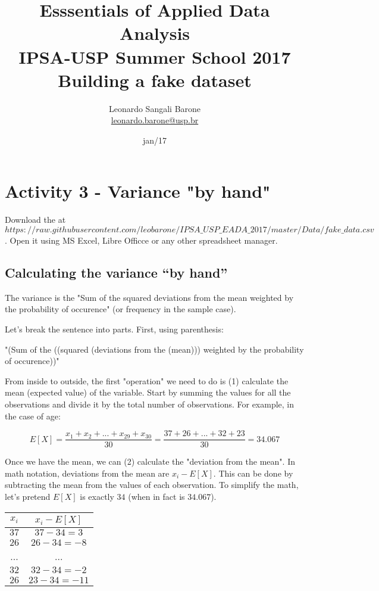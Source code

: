 \documentclass[11pt]{article}
\title{\textbf{Esssentials of Applied Data Analysis\\
				IPSA-USP Summer School 2017}\newline\\
				Building a fake dataset}
\author{Leonardo Sangali Barone\\ \href{leonardo.barone@usp.br}{leonardo.barone@usp.br}}
\date{jan/17}
\begin{document}
\maketitle

\section*{Activity 3 - Variance "by hand"
}


Download the at 
\[https://raw.githubusercontent.com/leobarone/IPSA\_USP\_EADA\_2017/master/Data/fake\_data.csv\]. 
Open it using MS Excel, Libre Officce or any other spreadsheet manager.

\subsection*{Calculating the variance ``by hand''}

The variance is the "Sum of the squared deviations from the mean weighted by the probability of occurence" (or frequency in the sample case).

Let's break the sentence into parts. First, using parenthesis:

"(Sum of the ((squared (deviations from the (mean))) weighted by the probability of occurence))"

From inside to outside, the first "operation" we need to do is (1) calculate the mean (expected value) of the variable. Start by summing the values for all the observations and divide it by the total number of observations. For example, in the case of age:

\[E[X] = \frac{x_1 + x_2 + ... + x_{29} + x_{30}}{30} = \frac{37+26+...+32+23}{30} = 34.067\]

Once we have the mean, we can (2) calculate the "deviation from the mean". In math notation, deviations from the mean are $x_i - E[X]$. This can be done by subtracting the mean from the values of each observation. To simplify the math, let's pretend $E[X]$ is exactly $34$ (when in fact is $34.067$).\\

\begin{tabular}{|c|c|}
	$x_i$ & $x_i - E[X]$\\
	\hline
	$37$ & $37 - 34 = 3$\\
	$26$ & $26 - 34  = -8$\\
	... & ...\\
	$32$ & $32 - 34  = -2$\\
	$26$ & $23 - 34  = -11$\\
\end{tabular}\\
\end{document}
